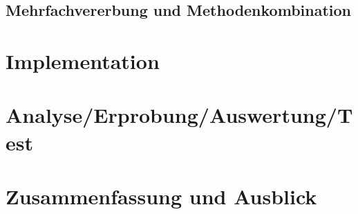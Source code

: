 



\section{Mehrfachvererbung und Methodenkombination}

\chapter{Implementation}  %
\label{implementation}

\chapter{Analyse/Erprobung/Auswertung/Test}

\chapter{Zusammenfassung und Ausblick}

 




